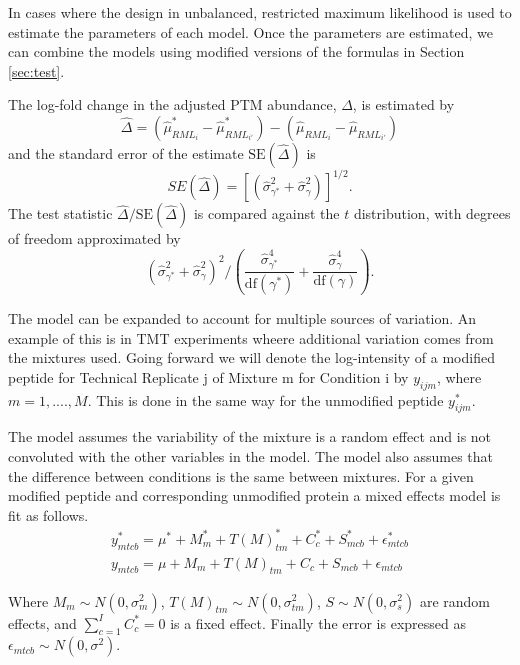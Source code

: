 \documentclass{mcp}
\begin{document}
In cases where the design in unbalanced, restricted maximum likelihood is used to estimate the parameters of each model. Once the parameters are estimated, we can combine the models using modified versions of the formulas in Section \ref{sec:test}.

The log-fold change in the adjusted PTM abundance, $\Delta$, is estimated by 
\[
\hat{\Delta} = (\hat{\mu}_{RML_i}^{\ast} - \hat{\mu}_{RML_{i'}}^{\ast}) - (\hat{\mu}_{RML_i} - \hat{\mu}_{RML_{i'}})
\]
and the standard error of the estimate $\mathrm{SE}(\hat{\Delta})$ is 
\[
SE(\hat{\Delta}) = \left[ \left( \hat{\sigma}_{\gamma^{\ast}}^{2} + \hat{\sigma}_{\gamma}^{2} \right) \right]^{1/2}.
\]
The test statistic $\hat{\Delta} / \mathrm{SE}(\hat{\Delta})$ is compared against the $t$ distribution, with degrees of freedom approximated by
\[
\left( \hat{\sigma}_{\gamma^{\ast}}^{2} + \hat{\sigma}_{\gamma}^{2} \right)^2 \bigg/
\left( \frac{\hat{\sigma}_{\gamma^{\ast}}^{4}}{\mathrm{df}(\gamma^{\ast})} + \frac{\hat{\sigma}_{\gamma}^{4}}{ \mathrm{df}(\gamma)} \right).
\]


The model can be expanded to account for multiple sources of variation. An example of this is in TMT experiments wheere additional variation comes from the mixtures used. Going forward we will denote the log-intensity of a modified peptide for Technical Replicate j of Mixture m for Condition i by $y_{ijm}$, where $m = 1,....,M$. This is done in the same way for the unmodified peptide $y^*_{ijm}$.

The model assumes the variability of the mixture is a random effect and is not convoluted with the other variables in the model. The model also assumes that the difference between conditions is the same between mixtures. For a given modified peptide and corresponding unmodified protein a mixed effects model is fit as follows.
\begin{align*}
y^*_{mtcb} = \mu^* + M^*_m + T(M)^*_{tm} + C^*_c + S^*_{mcb} + \epsilon^*_{mtcb}\\
y_{mtcb} = \mu + M_m + T(M)_{tm} + C_c + S_{mcb} + \epsilon_{mtcb}
\end{align*}

Where $M_m \sim N(0, \sigma^2_m)$, $T(M)_{tm} \sim N(0, \sigma^2_{tm})$, $S\sim N(0, \sigma^2_{s})$ are random effects, and $\sum_{c=1}^{I} C_{c}^{\ast} = 0$ is a fixed effect. Finally the error is expressed as $\epsilon_{mtcb} \sim N(0, \sigma^2)$.
\end{document}
